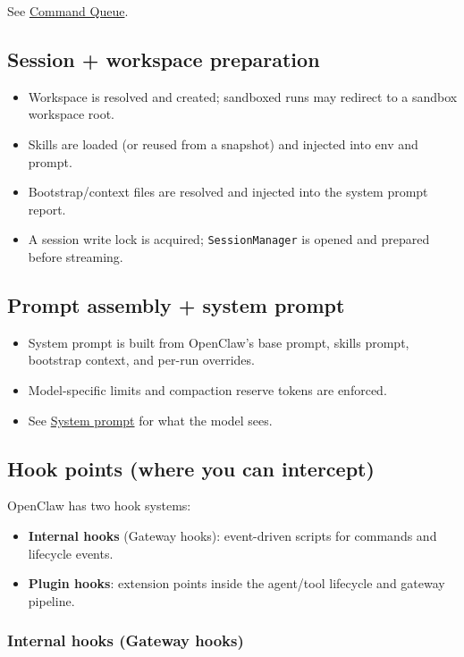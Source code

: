 See \href{/concepts/queue}{Command Queue}.

\subsection{Session + workspace preparation}


\begin{itemize}
  \item Workspace is resolved and created; sandboxed runs may redirect to a sandbox workspace root.
  \item Skills are loaded (or reused from a snapshot) and injected into env and prompt.
  \item Bootstrap/context files are resolved and injected into the system prompt report.
  \item A session write lock is acquired; \texttt{SessionManager} is opened and prepared before streaming.
\end{itemize}


\subsection{Prompt assembly + system prompt}


\begin{itemize}
  \item System prompt is built from OpenClaw’s base prompt, skills prompt, bootstrap context, and per-run overrides.
  \item Model-specific limits and compaction reserve tokens are enforced.
  \item See \href{/concepts/system-prompt}{System prompt} for what the model sees.
\end{itemize}


\subsection{Hook points (where you can intercept)}


OpenClaw has two hook systems:

\begin{itemize}
  \item \textbf{Internal hooks} (Gateway hooks): event-driven scripts for commands and lifecycle events.
  \item \textbf{Plugin hooks}: extension points inside the agent/tool lifecycle and gateway pipeline.
\end{itemize}


\subsubsection{Internal hooks (Gateway hooks)}


